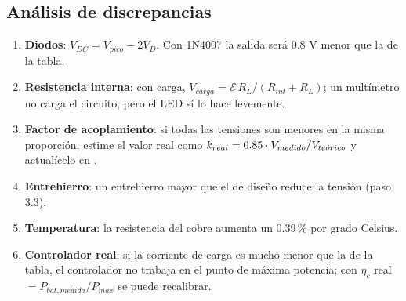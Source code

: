 \documentclass[11pt]{article}
\begin{document}
\subsection{Análisis de discrepancias}
\begin{enumerate}
  \item \textbf{Diodos}: $V_{DC}=V_{pico}-2V_D$. Con 1N4007 la salida será 0.8 V menor que la de la tabla.
  \item \textbf{Resistencia interna}: con carga, $V_{carga}=\mathcal{E}\,R_L/(R_{int}+R_L)$; un multímetro no
        carga el circuito, pero el LED sí lo hace levemente.
  \item \textbf{Factor de acoplamiento}: si todas las tensiones son menores en la misma proporción, estime el
        valor real como $k_{real}=0.85\cdot V_{medido}/V_{te\acute{o}rico}$ y actualícelo en
        .
  \item \textbf{Entrehierro}: un entrehierro mayor que el de diseño reduce la tensión (paso 3.3).
  \item \textbf{Temperatura}: la resistencia del cobre aumenta un 0.39\,\% por grado Celsius.
  \item \textbf{Controlador real}: si la corriente de carga es mucho menor que la de la tabla, el controlador no
        trabaja en el punto de máxima potencia; con $\eta_c$ real $=P_{bat,medida}/P_{max}$ se puede recalibrar.
\end{enumerate}
\end{document}
